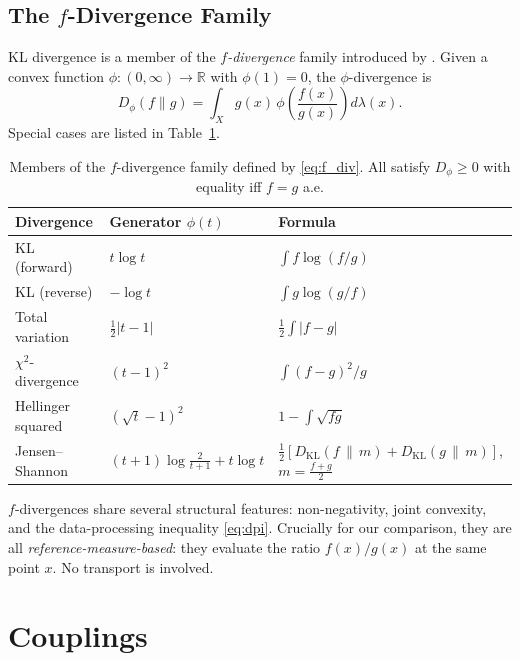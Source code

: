 \documentclass[12pt]{article}
\newcommand{\KL}[2]{D_{\mathrm{KL}}\!\left(#1\,\|\,#2\right)}
\newcommand{\R}{\mathbb{R}}
\begin{document}
\subsection{The \texorpdfstring{$f$}{f}-Divergence Family}
\label{sec:f_div}

KL divergence is a member of the \emph{$f$-divergence} family
introduced by \citet{Csiszar1975}.  Given a convex function
$\phi: (0,\infty) \to \R$ with $\phi(1) = 0$, the
$\phi$-divergence is
\begin{equation}\label{eq:f_div}
  D_\phi(f \| g)
  = \int_X g(x)\,\phi\!\left(\frac{f(x)}{g(x)}\right)d\lambda(x).
\end{equation}
Special cases are listed in Table~\ref{tab:f_divs}.

\begin{table}[ht]
\centering
\caption{Members of the $f$-divergence family defined by
\eqref{eq:f_div}.  All satisfy $D_\phi \geq 0$ with equality
iff $f = g$ a.e.}
\label{tab:f_divs}
\medskip
\begin{tabular}{p{4.2cm}p{3.6cm}p{4.5cm}}
\toprule
Divergence & Generator $\phi(t)$ & Formula \\
\midrule
KL (forward) & $t\log t$ & $\int f\log(f/g)$ \\
KL (reverse) & $-\log t$ & $\int g\log(g/f)$ \\
Total variation & $\frac{1}{2}|t-1|$ & $\frac{1}{2}\int|f-g|$ \\
$\chi^2$-divergence & $(t-1)^2$ & $\int(f-g)^2/g$ \\
Hellinger squared & $(\sqrt{t}-1)^2$ & $1 - \int\sqrt{fg}$ \\
Jensen--Shannon & $(t+1)\log\frac{2}{t+1}+t\log t$ & $\frac{1}{2}[\KL{f}{m}+\KL{g}{m}]$, $m=\frac{f+g}{2}$ \\
\bottomrule
\end{tabular}
\end{table}

$f$-divergences share several structural features:
non-negativity, joint convexity, and the data-processing
inequality \eqref{eq:dpi}.  Crucially for our comparison, they
are all \emph{reference-measure-based}: they evaluate the ratio
$f(x)/g(x)$ at the same point $x$.  No transport is involved.

\section{Couplings}
\label{sec:couplings}
\end{document}
